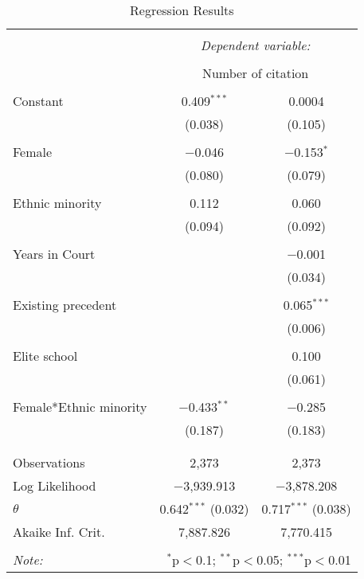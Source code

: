 
\begin{table}[!htbp] \centering 
  \caption{Regression Results} 
  \label{} 
\begin{tabular}{@{\extracolsep{5pt}}lcc} 
\\[-1.8ex]\hline 
\hline \\[-1.8ex] 
 & \multicolumn{2}{c}{\textit{Dependent variable:}} \\ 
\cline{2-3} 
\\[-1.8ex] & \multicolumn{2}{c}{Number of citation} \\ 
\hline \\[-1.8ex] 
 Constant & 0.409$^{***}$ & 0.0004 \\ 
  & (0.038) & (0.105) \\ 
  & & \\ 
 Female & $-$0.046 & $-$0.153$^{*}$ \\ 
  & (0.080) & (0.079) \\ 
  & & \\ 
 Ethnic minority & 0.112 & 0.060 \\ 
  & (0.094) & (0.092) \\ 
  & & \\ 
 Years in Court &  & $-$0.001 \\ 
  &  & (0.034) \\ 
  & & \\ 
 Existing precedent &  & 0.065$^{***}$ \\ 
  &  & (0.006) \\ 
  & & \\ 
 Elite school &  & 0.100 \\ 
  &  & (0.061) \\ 
  & & \\ 
 Female*Ethnic minority & $-$0.433$^{**}$ & $-$0.285 \\ 
  & (0.187) & (0.183) \\ 
  & & \\ 
\hline \\[-1.8ex] 
Observations & 2,373 & 2,373 \\ 
Log Likelihood & $-$3,939.913 & $-$3,878.208 \\ 
$\theta$ & 0.642$^{***}$  (0.032) & 0.717$^{***}$  (0.038) \\ 
Akaike Inf. Crit. & 7,887.826 & 7,770.415 \\ 
\hline 
\hline \\[-1.8ex] 
\textit{Note:}  & \multicolumn{2}{r}{$^{*}$p$<$0.1; $^{**}$p$<$0.05; $^{***}$p$<$0.01} \\ 
\end{tabular} 
\end{table} 
